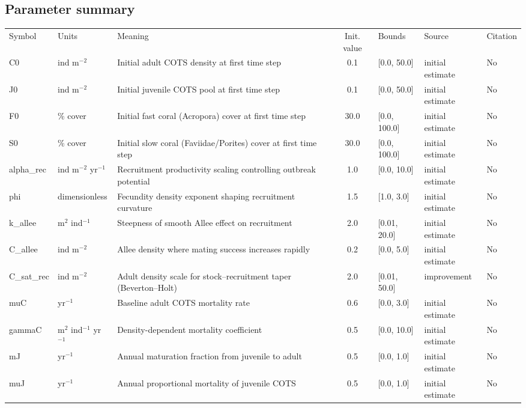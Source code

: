 \begin{landscape}
\subsection*{Parameter summary}
\begin{table}[ht]
\centering
\scriptsize
\setlength{\tabcolsep}{4pt}
\begin{tabularx}{1.0\linewidth}{l p{3cm} p{7cm} c l l l}
\toprule
Symbol & Units & Meaning & Init. value & Bounds & Source & Citation \\
C0 & ind m$^{-2}$ & Initial adult COTS density at first time step & 0.1 & [0.0, 50.0] & initial estimate & No \\
J0 & ind m$^{-2}$ & Initial juvenile COTS pool at first time step & 0.1 & [0.0, 50.0] & initial estimate & No \\
F0 & \% cover & Initial fast coral (Acropora) cover at first time step & 30.0 & [0.0, 100.0] & initial estimate & No \\
S0 & \% cover & Initial slow coral (Faviidae/Porites) cover at first time step & 30.0 & [0.0, 100.0] & initial estimate & No \\
alpha\_rec & ind m$^{-2}$ yr$^{-1}$ & Recruitment productivity scaling controlling outbreak potential & 1.0 & [0.0, 10.0] & initial estimate & No \\
phi & dimensionless & Fecundity density exponent shaping recruitment curvature & 1.5 & [1.0, 3.0] & initial estimate & No \\
k\_allee & m$^{2}$ ind$^{-1}$ & Steepness of smooth Allee effect on recruitment & 2.0 & [0.01, 20.0] & initial estimate & No \\
C\_allee & ind m$^{-2}$ & Allee density where mating success increases rapidly & 0.2 & [0.0, 5.0] & initial estimate & No \\
C\_sat\_rec & ind m$^{-2}$ & Adult density scale for stock–recruitment taper (Beverton–Holt) & 2.0 & [0.01, 50.0] & improvement & No \\
muC & yr$^{-1}$ & Baseline adult COTS mortality rate & 0.6 & [0.0, 3.0] & initial estimate & No \\
gammaC & m$^{2}$ ind$^{-1}$ yr$^{-1}$ & Density-dependent mortality coefficient & 0.5 & [0.0, 10.0] & initial estimate & No \\
mJ & yr$^{-1}$ & Annual maturation fraction from juvenile to adult & 0.5 & [0.0, 1.0] & initial estimate & No \\
muJ & yr$^{-1}$ & Annual proportional mortality of juvenile COTS & 0.5 & [0.0, 1.0] & initial estimate & No \\

\end{tabularx}
\end{table}
\end{landscape}
